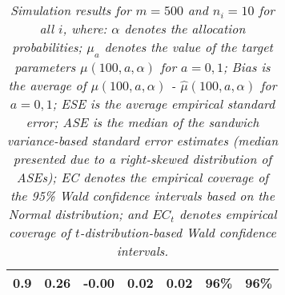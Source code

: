 \documentclass[12pt, letterpaper]{article}
\begin{document}
\begin{table}[ht!]
\begin{tabular}{rrrrrll}
	0.9 & 0.26 & -0.00 & 0.02 & 0.02 & 96\% & 96\% \\  
		\hline
	\end{tabular}
	\egroup
	\caption*{\textit{Simulation results for $m = 500$ and $n_i = 10$ for all $i$, where: $\alpha$ denotes the allocation probabilities; $\mu_a$ denotes the value of the target parameters $\mu(100, a, \alpha)$ for $a=0,1$; Bias is the average of $\mu(100, a, \alpha)$ - $\hat{\mu}(100, a, \alpha)$ for $a=0, 1$; ESE is the average empirical standard error; ASE is the median of the sandwich variance-based standard error estimates (median presented due to a right-skewed distribution of ASEs); EC denotes the empirical coverage of the 95\% Wald confidence intervals based on the Normal distribution; and $EC_t$ denotes empirical coverage of $t$-distribution-based Wald confidence intervals.}}
\end{table}

\clearpage

\end{document}
